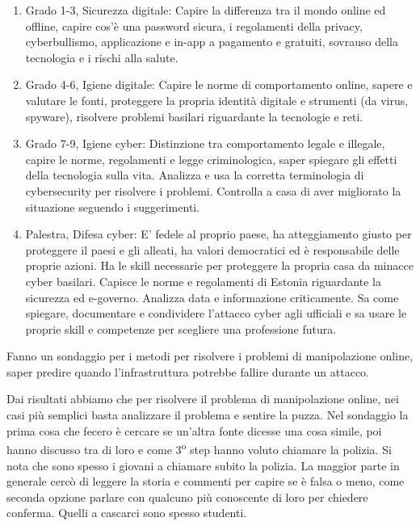 \documentclass[a4page, 11pt, twocolumn]{article}
\begin{document}
\begin{enumerate}
	\def\labelenumi{\arabic{enumi}.}
	\item
	Grado 1-3, Sicurezza digitale: Capire la differenza tra il mondo
	online ed offline, capire cos'è una password sicura, i regolamenti
	della privacy, cyberbullismo, applicazione e in-app a pagamento e
	gratuiti, sovrauso della tecnologia e i rischi alla salute.
	\item
	Grado 4-6, Igiene digitale: Capire le norme di comportamento online,
	sapere e valutare le fonti, proteggere la propria identità digitale e
	strumenti (da virus, spyware), risolvere problemi basilari riguardante
	la tecnologie e reti.
	\item
	Grado 7-9, Igiene cyber: Distinzione tra comportamento legale e
	illegale, capire le norme, regolamenti e legge criminologica, saper
	spiegare gli effetti della tecnologia sulla vita. Analizza e usa la
	corretta terminologia di cybersecurity per risolvere i problemi.
	Controlla a casa di aver migliorato la situazione seguendo i
	suggerimenti. 
	\item
	Palestra, Difesa cyber: E' fedele al proprio paese, ha atteggiamento
	giusto per proteggere il paesi e gli alleati, ha valori democratici ed
	è responsabile delle proprie azioni. Ha le skill necessarie per
	proteggere la propria casa da minacce cyber basilari. Capisce le norme
	e regolamenti di Estonia riguardante la sicurezza ed e-governo.
	Analizza data e informazione criticamente. Sa come spiegare,
	documentare e condividere l'attacco cyber agli ufficiali e sa usare le
	proprie skill e competenze per scegliere una professione futura.
\end{enumerate}

Fanno un sondaggio per i metodi per risolvere i problemi di
manipolazione online, saper predire quando l'infrastruttura potrebbe
fallire durante un attacco.

Dai risultati abbiamo che per risolvere il problema di manipolazione
online, nei casi più semplici basta analizzare il problema e sentire la
puzza. Nel sondaggio la prima cosa che fecero è cercare se un'altra
fonte dicesse una cosa simile, poi hanno discusso tra di loro e come
3\textsuperscript{o} step hanno voluto chiamare la polizia. Si nota che
sono spesso i giovani a chiamare subito la polizia. La maggior parte in
generale cercò di leggere la storia e commenti per capire se è falsa o
meno, come seconda opzione parlare con qualcuno più conoscente di loro
per chiedere conferma. Quelli a cascarci sono spesso studenti.
\end{document}
